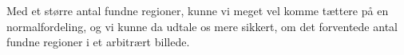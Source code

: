 {Med et større antal fundne regioner, kunne vi meget vel komme tættere på
en normalfordeling, og vi kunne da udtale os mere sikkert, om det
forventede antal fundne regioner i et arbitrært billede.

\begin{figure}[!h]
    \centering
    \\
\end{figure}}
